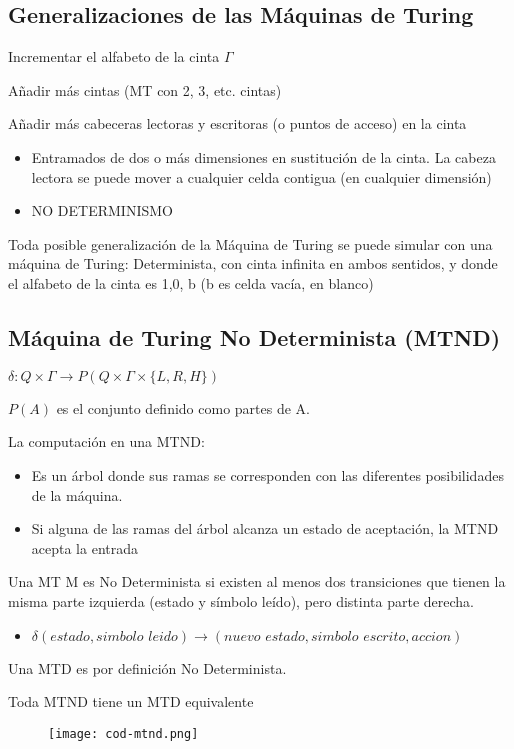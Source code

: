 \subsection{Generalizaciones de las Máquinas de Turing}
Incrementar el alfabeto de la cinta $\Gamma$

Añadir más cintas (MT con 2, 3, etc. cintas)

Añadir más cabeceras lectoras y escritoras (o puntos de acceso) en la cinta
\begin{itemize}
    \item Entramados de dos o más dimensiones en sustitución de la cinta. La cabeza lectora se puede mover a cualquier celda contigua (en cualquier dimensión)
    \item NO DETERMINISMO
\end{itemize}

Toda posible generalización de la Máquina de Turing se puede simular con una máquina de Turing: Determinista, con cinta infinita en ambos sentidos, y donde el alfabeto de la cinta es {1,0, b} (b es celda vacía, en blanco)

\subsection{Máquina de Turing No Determinista (MTND)}
$\delta: Q \times \Gamma \rightarrow P(Q\times \Gamma \times \{L, R, H\})$

$P(A)$ es el conjunto definido como partes de A.

La computación en una MTND:
\begin{itemize}
    \item Es un árbol donde sus ramas se corresponden con las diferentes posibilidades de la máquina.
    \item Si alguna de las ramas del árbol alcanza un estado de aceptación, la MTND acepta la entrada
\end{itemize}

Una MT M es No Determinista si existen al menos dos transiciones que tienen la misma parte izquierda (estado y símbolo leído), pero distinta parte derecha. 
\begin{itemize}
    \item $\delta(\textit{estado},\textit{simbolo leido})\rightarrow (\textit{nuevo estado},\textit{simbolo escrito},\textit{accion})$
\end{itemize}

Una MTD es por definición No Determinista.

Toda MTND tiene un MTD equivalente

\begin{figure}[H]
    {\texttt{[image: cod-mtnd.png]}}
\end{figure}